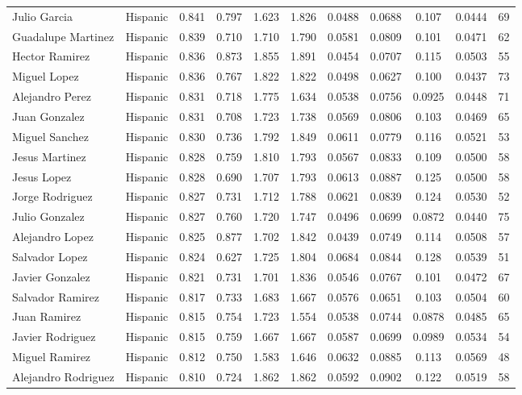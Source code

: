 \documentclass[]{article}
\begin{document}
\begin{tabular}{lcccccccccc}
Julio Garcia & Hispanic & 0.841 & 0.797 & 1.623 & 1.826 & 0.0488 & 0.0688 & 0.107 & 0.0444 & 69 \\
Guadalupe Martinez & Hispanic & 0.839 & 0.710 & 1.710 & 1.790 & 0.0581 & 0.0809 & 0.101 & 0.0471 & 62 \\
Hector Ramirez & Hispanic & 0.836 & 0.873 & 1.855 & 1.891 & 0.0454 & 0.0707 & 0.115 & 0.0503 & 55 \\
Miguel Lopez & Hispanic & 0.836 & 0.767 & 1.822 & 1.822 & 0.0498 & 0.0627 & 0.100 & 0.0437 & 73 \\
Alejandro Perez & Hispanic & 0.831 & 0.718 & 1.775 & 1.634 & 0.0538 & 0.0756 & 0.0925 & 0.0448 & 71 \\
Juan Gonzalez & Hispanic & 0.831 & 0.708 & 1.723 & 1.738 & 0.0569 & 0.0806 & 0.103 & 0.0469 & 65 \\
Miguel Sanchez & Hispanic & 0.830 & 0.736 & 1.792 & 1.849 & 0.0611 & 0.0779 & 0.116 & 0.0521 & 53 \\
Jesus Martinez & Hispanic & 0.828 & 0.759 & 1.810 & 1.793 & 0.0567 & 0.0833 & 0.109 & 0.0500 & 58 \\
Jesus Lopez & Hispanic & 0.828 & 0.690 & 1.707 & 1.793 & 0.0613 & 0.0887 & 0.125 & 0.0500 & 58 \\
Jorge Rodriguez & Hispanic & 0.827 & 0.731 & 1.712 & 1.788 & 0.0621 & 0.0839 & 0.124 & 0.0530 & 52 \\
Julio Gonzalez & Hispanic & 0.827 & 0.760 & 1.720 & 1.747 & 0.0496 & 0.0699 & 0.0872 & 0.0440 & 75 \\
Alejandro Lopez & Hispanic & 0.825 & 0.877 & 1.702 & 1.842 & 0.0439 & 0.0749 & 0.114 & 0.0508 & 57 \\
Salvador Lopez & Hispanic & 0.824 & 0.627 & 1.725 & 1.804 & 0.0684 & 0.0844 & 0.128 & 0.0539 & 51 \\
Javier Gonzalez & Hispanic & 0.821 & 0.731 & 1.701 & 1.836 & 0.0546 & 0.0767 & 0.101 & 0.0472 & 67 \\
Salvador Ramirez & Hispanic & 0.817 & 0.733 & 1.683 & 1.667 & 0.0576 & 0.0651 & 0.103 & 0.0504 & 60 \\
Juan Ramirez & Hispanic & 0.815 & 0.754 & 1.723 & 1.554 & 0.0538 & 0.0744 & 0.0878 & 0.0485 & 65 \\
Javier Rodriguez & Hispanic & 0.815 & 0.759 & 1.667 & 1.667 & 0.0587 & 0.0699 & 0.0989 & 0.0534 & 54 \\
Miguel Ramirez & Hispanic & 0.812 & 0.750 & 1.583 & 1.646 & 0.0632 & 0.0885 & 0.113 & 0.0569 & 48 \\
Alejandro Rodriguez & Hispanic & 0.810 & 0.724 & 1.862 & 1.862 & 0.0592 & 0.0902 & 0.122 & 0.0519 & 58 \\

\end{tabular}
\end{document}
